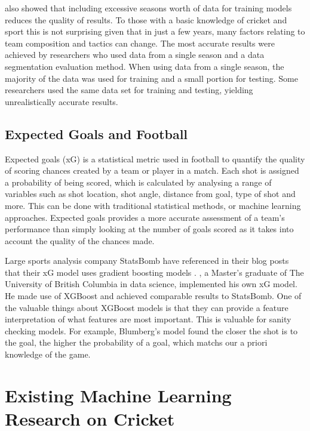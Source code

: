 \documentclass[12pt,a4paper]{report}
\theoremstyle{definition}
\begin{document}
\citet{horvat2020} also showed that including excessive seasons worth of data for training models reduces the quality of results. 
To those with a basic knowledge of cricket and sport this is not surprising given that in just a few years, many factors relating to team composition and tactics can change. 
The most accurate results were achieved by researchers who used data from a single season and a data segmentation evaluation method. 
When using data from a single season, the majority of the data was used for training and a small portion for testing. 
Some researchers used the same data set for training and testing, yielding unrealistically accurate results.

\subsection{Expected Goals and Football}

Expected goals (xG) is a statistical metric used in football to quantify the quality of scoring chances created by a team or player in a match. 
Each shot is assigned a probability of being scored, which is calculated by analysing a range of variables such as shot location, shot angle, distance from goal, type of shot and more. 
This can be done with traditional statistical methods, or machine learning approaches.
Expected goals provides a more accurate assessment of a team's performance than simply looking at the number of goals scored as it takes into account the quality of the chances made.

Large sports analysis company StatsBomb have referenced in their blog posts that their xG model uses gradient boosting models \citep{statsbomb2022}. 
\citet{Blumberg2020}, a Master's graduate of The University of British Columbia in data science, implemented his own xG model.
He made use of XGBoost \citep{Chen2016} and achieved comparable results to StatsBomb.
One of the valuable things about XGBoost models is that they can provide a feature interpretation of what features are most important.
This is valuable for sanity checking models.
For example, Blumberg's model found the closer the shot is to the goal, the higher the probability of a goal, which matchs our a priori knowledge of the game.

\section{Existing Machine Learning Research on Cricket} \label{sec:CrickSurvey}
\end{document}
